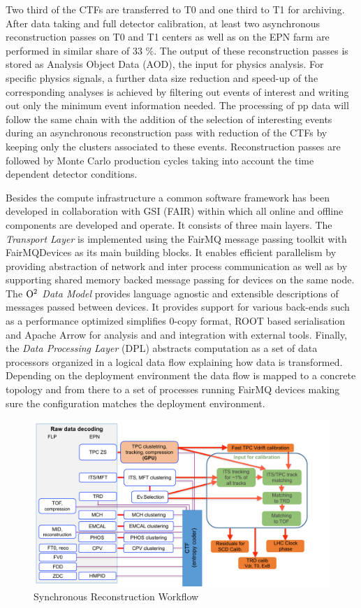 Two third of the CTFs are transferred to T0 and one third to T1 for archiving.
After data taking and full detector calibration, at least two asynchronous
reconstruction passes on T0 and T1 centers as well as on the EPN farm are
performed in similar share of 33 \%. The output of these reconstruction passes is stored as Analysis  Object Data (AOD), the input for physics analysis. For specific physics signals, a further data size
reduction and speed-up of the corresponding analyses is achieved by filtering out events of interest and writing out only the minimum event information needed.
The processing of pp data will follow the same chain with the addition of the selection of interesting
events during an asynchronous reconstruction pass with reduction of the CTFs by keeping only the
clusters associated to these events. Reconstruction passes are followed by Monte Carlo production cycles taking into account the time dependent detector conditions.

Besides the compute infrastructure a common software framework has
been developed in collaboration with GSI (FAIR) within which all
online and offline components are developed and operate. It
consists of three main layers.
The {\it Transport Layer} is implemented using the FairMQ message
passing toolkit with FairMQDevices as its main building blocks.
It enables efficient parallelism by providing
abstraction of network and inter process communication as well as
by supporting shared memory backed message passing for devices on the same node. The {\it ${\rm O}^2$ Data
  Model} provides language agnostic and extensible descriptions of messages passed
between devices.
It  provides support for various
back-ends such as a performance optimized simplifies 0-copy format, ROOT based serialisation and Apache Arrow for analysis and and
integration with external tools.
Finally, the {\it Data Processing Layer} (DPL) abstracts computation as a set of data processors
organized in a logical data flow explaining how data is transformed.
Depending on the deployment environment the data
flow is mapped to a concrete topology and from there to a set of processes
running FairMQ devices making sure the configuration matches the deployment
environment.
\begin{figure}[hbtp]
  \begin{center}
    \includegraphics[width=.99\textwidth]{fig/readout/flowSync.pdf}
  \end{center}
  \caption{Synchronous Reconstruction Workflow}
  \label{fig:rwf}
\end{figure}
